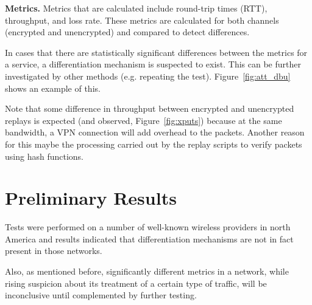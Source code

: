 \documentclass[letterpaper]{sig-alternate-10pt}
\begin{document}
\noindent\textbf{Metrics.}
Metrics that are calculated include round-trip times (RTT), throughput, and loss rate. These metrics are calculated for both channels (encrypted and unencrypted) and compared to detect differences.

In cases that there are statistically significant differences between the metrics for a service, a differentiation mechanism is suspected to exist. This can be further investigated by other methods (e.g. repeating the test). Figure~\ref{fig:att_dbu} shows an example of this.


Note that some difference in throughput between encrypted and unencrypted replays is expected (and observed, Figure~\ref{fig:xputs}) because at the same bandwidth, a VPN connection will add overhead to the packets. Another reason for this maybe the processing carried out by the replay scripts to verify packets using hash functions.


\section{Preliminary Results}

Tests were performed on a number of well-known wireless providers in north America and results indicated that differentiation mechanisms are not in fact present in those networks.

Also, as mentioned before, significantly different metrics in a network, while rising suspicion about its treatment of a certain type of traffic, will be inconclusive until complemented by further testing.
\end{document}
